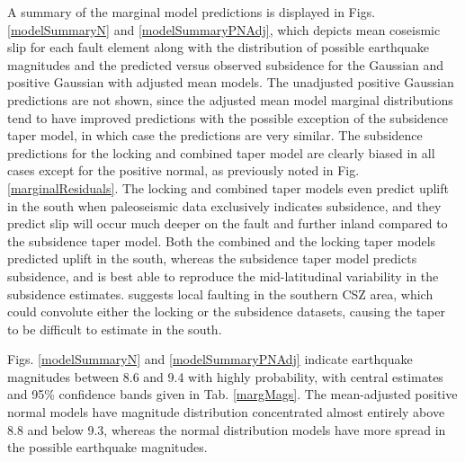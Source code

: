{A summary of the marginal model predictions is displayed in Figs. \ref{modelSummaryN} and \ref{modelSummaryPNAdj}, which depicts mean coseismic slip for each fault element along with the distribution of possible earthquake magnitudes and the predicted versus observed subsidence for the Gaussian and positive Gaussian with adjusted mean models.  The unadjusted positive Gaussian predictions are not shown, since the adjusted mean model marginal distributions tend to have improved predictions with the possible exception of the subsidence taper model, in which case the predictions are very similar.  The subsidence predictions for the locking and combined taper model are clearly biased in all cases except for the positive normal, as previously noted in Fig. \ref{marginalResiduals}.  The locking and combined taper models even predict uplift in the south when paleoseismic data exclusively indicates subsidence, and they predict slip will occur much deeper on the fault and further inland compared to the subsidence taper model. Both the combined and the locking taper models predicted uplift in the south, whereas the subsidence taper model predicts subsidence, and is best able to reproduce the mid-latitudinal variability in the subsidence estimates.  \citet{clarkeCarver1992} suggests local faulting in the southern CSZ area, which could convolute either the locking or the subsidence datasets, causing the taper to be difficult to estimate in the south.

Figs. \ref{modelSummaryN} and \ref{modelSummaryPNAdj} indicate earthquake magnitudes between 8.6 and 9.4 with highly probability, with central estimates and 95\% confidence bands given in Tab. \ref{margMags}.  The mean-adjusted positive normal models have magnitude distribution concentrated almost entirely above 8.8 and below 9.3, whereas the normal distribution models have more spread in the possible earthquake magnitudes.

}
